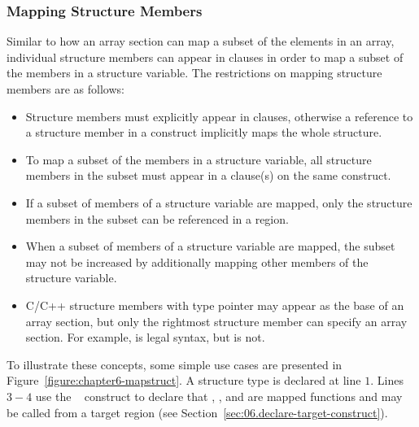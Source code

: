 \subsubsection{Mapping Structure Members}
\label{ssec:06.map-structs}

Similar to how an array section can map a subset of the elements in an array,
individual structure members can appear in  clauses in order to map
a subset of the members in a structure variable.  The restrictions on mapping
structure members are as follows:

\begin{itemize}

 \item Structure members must explicitly appear in  clauses,
 otherwise a reference to a structure member in a  construct
 implicitly maps the whole structure.

 \item To map a subset of the members in a structure variable, 
 all structure members in the subset must appear in a  clause(s) on the same
 construct.

 \item If a subset of members of a structure variable are mapped, only the
 structure members in the subset can be referenced in a  region.

 \item When a subset of members of a structure variable are mapped, the
 subset may not be increased by additionally mapping other members of the
 structure variable.

 \item C/C++ structure members with type pointer may appear as the base of an
 array section, but only the rightmost structure member can specify an array
 section.  For example,  is legal syntax, but  is not.

\end{itemize}

To illustrate these concepts, some simple use cases are presented in
Figure~\ref{figure:chapter6-mapstruct}.  A structure type  is declared
at line $1$. Lines $3-4$ use the ~ construct to declare that
, , and  are mapped functions and may be called from a target region 
(see Section~\ref{sec:06.declare-target-construct}).

